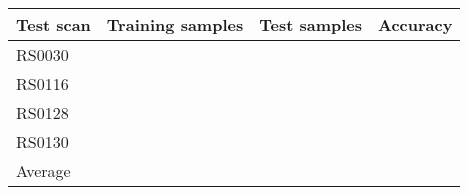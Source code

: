 \begin{tabular}{@{}lrrr@{}}
\toprule
Test scan & Training samples & Test samples & Accuracy \\ \midrule
RS0030    &                  &              &          \\
RS0116    &                  &              &          \\
RS0128    &                  &              &          \\
RS0130    &                  &              &          \\ \midrule
Average   &                  &              &          \\ \bottomrule
\end{tabular}
